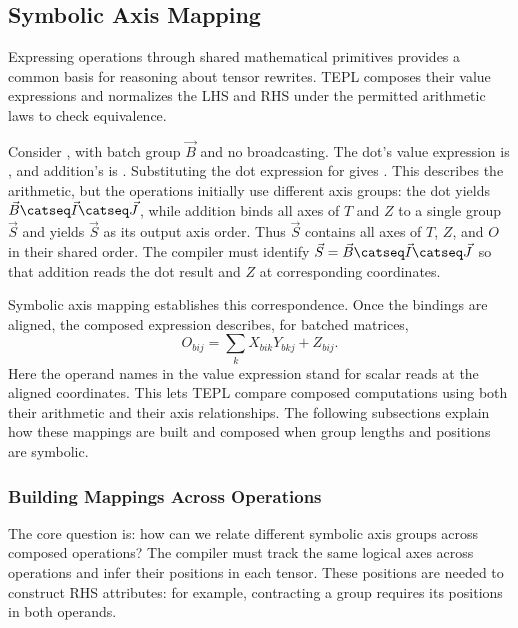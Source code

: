 \subsection{Symbolic Axis Mapping}
\label{sec:axis-mapping}
Expressing operations through shared mathematical primitives provides a
common basis for reasoning about tensor rewrites. TEPL composes their
value expressions and normalizes the LHS and RHS under the permitted
arithmetic laws to check equivalence.

Consider , with batch group $\vec B$ and no broadcasting.
The dot's value expression is , and addition's
is . Substituting the dot expression for  gives
.
This describes the arithmetic, but the operations initially use different
axis groups: the dot yields $\vec B\catseq\vec I\catseq\vec J$, while addition binds
all axes of $T$ and $Z$ to a single group $\vec S$ and yields $\vec S$ as its output
axis order. Thus $\vec S$ contains all axes of $T$, $Z$, and $O$ in their shared
order. The compiler must identify $\vec S=\vec B\catseq\vec I\catseq\vec J$ so that addition
reads the dot result and $Z$ at corresponding coordinates.

Symbolic axis mapping establishes this correspondence. Once the bindings
are aligned, the composed expression describes, for batched matrices,
\begin{equation}
 O_{bij}=\sum_k X_{bik}Y_{bkj}+Z_{bij}.
\end{equation}
Here the operand names in the value expression stand for scalar reads at
the aligned coordinates. This lets TEPL compare composed computations
using both their arithmetic and their axis relationships.
The following subsections explain how these mappings are built and composed
when group lengths and positions are symbolic.

\subsubsection{Building Mappings Across Operations}
\label{sec:mapping-tables}
The core question is: how can we relate different symbolic axis groups
across composed operations? The compiler must track the same logical axes
across operations and infer their positions in each tensor. These positions
are needed to construct RHS attributes: for example, contracting a group
requires its positions in both operands.

